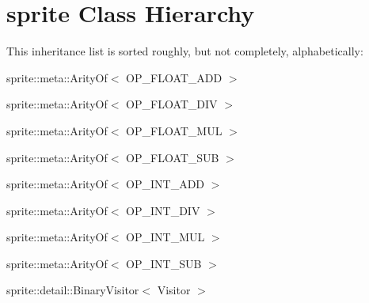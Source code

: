 \section{sprite Class Hierarchy}
This inheritance list is sorted roughly, but not completely, alphabetically:\begin{CompactList}
\item sprite::meta::Arity\-Of$<$ OP\_\-FLOAT\_\-ADD $>$\item sprite::meta::Arity\-Of$<$ OP\_\-FLOAT\_\-DIV $>$\item sprite::meta::Arity\-Of$<$ OP\_\-FLOAT\_\-MUL $>$\item sprite::meta::Arity\-Of$<$ OP\_\-FLOAT\_\-SUB $>$\item sprite::meta::Arity\-Of$<$ OP\_\-INT\_\-ADD $>$\item sprite::meta::Arity\-Of$<$ OP\_\-INT\_\-DIV $>$\item sprite::meta::Arity\-Of$<$ OP\_\-INT\_\-MUL $>$\item sprite::meta::Arity\-Of$<$ OP\_\-INT\_\-SUB $>$\item {}
\item sprite::detail::Binary\-Visitor$<$ Visitor $>$\item {}
\item {}
\item {}
\item {}
\item {}
\begin{CompactList}
\item {}
\end{CompactList}
\item {}
\begin{CompactList}
\item {}
\begin{CompactList}

\end{CompactList}
\end{CompactList}
\end{CompactList}
